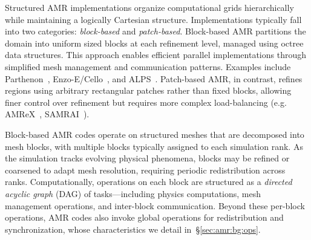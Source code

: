 Structured AMR implementations organize computational grids hierarchically while maintaining a
logically Cartesian structure.
Implementations typically fall into two categories: \emph{block-based} and \emph{patch-based}.
Block-based AMR partitions the domain into uniform sized blocks at each refinement level, managed
using octree data structures.
This approach enables efficient parallel implementations through simplified mesh management and
communication patterns.
Examples include Parthenon~\cite{Grete2023:Parthenon},
Enzo-E/Cello~\cite{Emeri2019:EnzoECelloProject}, and ALPS~\cite{Burst2008:ALPS}.
Patch-based AMR, in contrast, refines regions using arbitrary rectangular patches rather than fixed
blocks, allowing finer control over refinement but requires more complex load-balancing (e.g.
AMReX~\cite{Zhang2021:AMReX}, SAMRAI~\cite{Gunne2016:SAMRAI}).



Block-based AMR codes operate on structured meshes that are decomposed into mesh blocks, with
multiple blocks typically assigned to each simulation rank.
As the simulation tracks evolving physical phenomena, blocks may be refined or coarsened to adapt
mesh resolution, requiring periodic redistribution across ranks.
Computationally, operations on each block are structured as a \emph{directed acyclic graph} (DAG)
of tasks---including physics computations, mesh management operations, and inter-block
communication.
Beyond these per-block operations, AMR codes also invoke global operations for redistribution and
synchronization, whose characteristics we detail in~\S\ref{sec:amr:bg:ops}.

